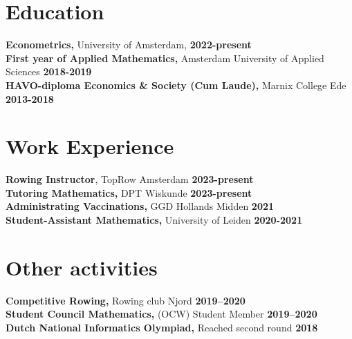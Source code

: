 \documentclass[margin,line]{res}
\begin{document}
\newcommand{\myname}{Tim ~Wassink}
\newlength{\mynamewidth}
\settowidth{\mynamewidth}{\namefont\myname}

\name{\hspace*{0.5\textwidth}\hspace{-0.5\mynamewidth} \myname \vspace*{.1in}}






\section{\sc Education}
{\bf Econometrics,} University of Amsterdam, \hfill {\bf 2022-present}\\
{\bf First year of Applied Mathematics,} Amsterdam University of Applied Sciences \hfill {\bf 2018-2019}\\
{\bf HAVO-diploma Economics \& Society (Cum Laude),} Marnix College Ede \hfill {\bf 2013-2018}\\

\section{\sc Work Experience}
{\bf Rowing Instructor}, TopRow Amsterdam \hfill{\bf 2023-present} \\
{\bf Tutoring Mathematics,} DPT Wiskunde \hfill{\bf 2023-present} \\
{\bf Administrating Vaccinations,} GGD Hollands Midden \hfill{\bf 2021} \\
{\bf Student-Assistant Mathematics,} University of Leiden \hfill {\bf 2020-2021}\\


\vspace{-1em}


\vspace{-1em}


\section{\sc Other activities}
{\bf Competitive Rowing,} Rowing club Njord \hfill{\bf 2019--2020} \\
{\bf Student Council Mathematics,} (OCW) Student Member \hfill{\bf 2019--2020}
\\
{\bf Dutch National Informatics Olympiad,} Reached second round \hfill{\bf 2018}
\end{document}
